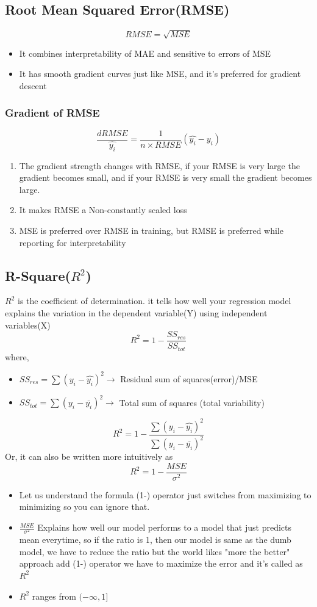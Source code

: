 \documentclass[12pt]{extarticle}
\begin{document}
\subsection{Root Mean Squared Error(RMSE)}  
$$RMSE = \sqrt{MSE}$$ 
\begin{itemize}
    \item It combines interpretability of MAE and sensitive to errors of MSE
    \item It has smooth gradient curves just like MSE, and it's preferred for gradient descent 
\end{itemize}

\subsubsection{Gradient of RMSE}
$$ \frac{d RMSE}{\hat{y_i}} = \frac{1}{n \times RMSE} (\hat{y_i}-y_i)$$
\begin{enumerate}
    \item The gradient strength changes with RMSE, if your RMSE is very large the gradient becomes small, and if your RMSE is very small the gradient becomes large.
    \item It makes RMSE a Non-constantly scaled loss
    \item MSE is preferred over RMSE in training, but RMSE is preferred while reporting for interpretability  
\end{enumerate}

\subsection{R-Square(\(R^2\))}
\(R^2\) is the coefficient of determination. it tells how well your regression model 
explains the variation in the dependent variable(Y) using independent variables(X)
$$R^2 = 1-\frac{SS_{res}}{SS_{tot}}$$
where,
\begin{itemize}
    \item \(SS_{res} = \sum(y_i - \hat{y_i})^2 \to\) Residual sum of squares(error)/MSE
    \item \( SS_{tot} = \sum(y_i - \bar{y_i})^2 \to\) Total sum of squares (total variability)
\end{itemize}
$$R^2 = 1-\frac{ \sum(y_i - \hat{y_i})^2 }{ \sum(y_i - \bar{y_i})^2} $$
Or, it can also be written more intuitively as 
$$ R^2 = 1 - \frac{MSE}{\sigma^2} $$

\begin{itemize}
    \item Let us understand the formula (1-) operator just switches from maximizing to minimizing
so you can ignore that. \\
    \item \(\frac{MSE}{\sigma^2}\) Explains how well our model performs to a model that 
just predicts mean everytime, so if the ratio is 1, then our model is same as the dumb model,
we have to reduce the ratio but the world likes "more the better" approach 
add (1-) operator we have to maximize the error and it's called as \(R^2\) 
\item \(R^2\) ranges from \((-\infty,1]\)
\end{itemize}
\end{document}
